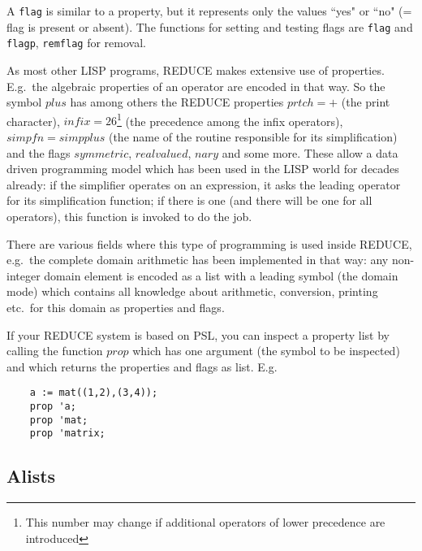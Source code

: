 \documentclass[11pt]{article}
\makeatletter
\newcommand{\reduce}{\small REDUCE}
\newcommand{\ttindex}[1]{\index{#1@{\texttt{#1}}}}
\makeatother
\begin{document}
A {\tt flag} is similar to a property, but
it represents only the values ``yes" or ``no" (= flag is
present or absent). The functions for setting and
testing flags are {\tt flag}\ttindex{flag} and {\tt flagp}, 
{\tt remflag} for removal.

As most other LISP programs, {\reduce} makes extensive use of properties. 
E.g.\  the  algebraic properties of an operator are encoded
in that way. So the symbol $plus$ has among others the {\reduce}
properties $prtch=+$ (the print character), 
$infix=26$\footnote{This number may change if additional operators
of lower precedence are introduced}
(the precedence among the infix operators), $simpfn=simpplus$
(the name of the routine responsible for its simplification)
and the flags $symmetric$, $realvalued$, $nary$ and some more.
These allow a data driven programming model which has been used
in the LISP world for decades already: if the simplifier
operates on an expression, it asks the leading operator for
its simplification function; if there is one (and there will be
one for all operators), this function is invoked to do the job.

There are various fields where this type of programming is used
inside {\reduce}, e.g.\ the complete domain arithmetic has been
implemented in that way: any non-integer domain element is encoded
as a list with a leading symbol (the domain mode) which contains
all knowledge about arithmetic, conversion, printing etc.\  for
this domain as properties and flags.  

If your {\reduce} system is based on PSL, you can inspect a
property list by calling the function $prop$\ttindex{prop} which  
has one argument (the symbol to be inspected) and which returns
the properties and flags as list. E.g. 
\begin{verbatim}
    a := mat((1,2),(3,4));
    prop 'a;
    prop 'mat;
    prop 'matrix;
\end{verbatim}


\subsection{Alists}
\end{document}
